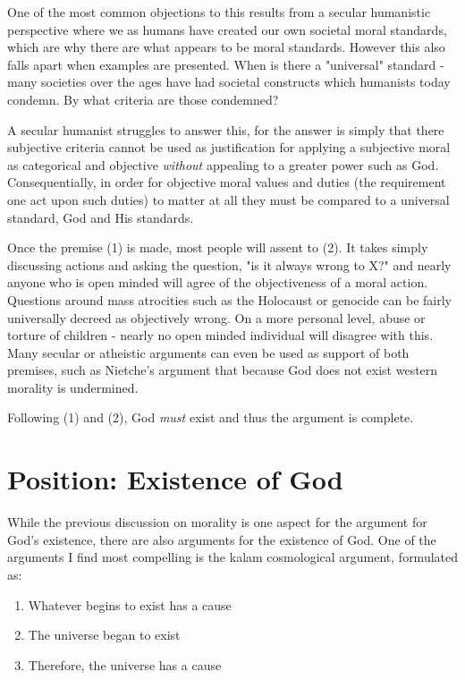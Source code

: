 \documentclass[12pt]{turabian-researchpaper}
\begin{document}
One of the most common objections to this results from a secular humanistic perspective where we as humans have created our own societal moral standards, which are why there are what appears to be moral standards. However this also falls apart when examples are presented. When is there a "universal" standard - many societies over the ages have had societal constructs which humanists today condemn. By what criteria are those condemned? 

A secular humanist struggles to answer this, for the answer is simply that there subjective criteria cannot be used as justification for applying a subjective moral as categorical and objective \textit{without} appealing to a greater power such as God. Consequentially, in order for objective moral values and duties (the requirement one act upon such duties) to matter at all they must be compared to a universal standard, God and His standards.

Once the premise (1) is made, most people will assent to (2). It takes simply discussing actions and asking the question, "is it always wrong to X?" and nearly anyone who is open minded will agree of the objectiveness of a moral action. Questions around mass atrocities such as the Holocaust or genocide can be fairly universally decreed as objectively wrong. On a more personal level, abuse or torture of children - nearly no open minded individual will disagree with this. Many secular or atheistic arguments can even be used as support of both premises, such as Nietche's argument that because God does not exist western morality is undermined. \autocite{evans2014}

Following (1) and (2), God \textit{must} exist and thus the argument is complete.

\section{Position: Existence of God}

While the previous discussion on morality is one aspect for the argument for God's existence, there are also arguments for the existence of God. One of the arguments I find most compelling is the kalam cosmological argument, formulated as:\autocite[pg.111]{craig2008reasonable}

\begin{enumerate}
\item Whatever begins to exist has a cause
\item The universe began to exist
\item Therefore, the universe has a cause
\end{enumerate}
\end{document}
